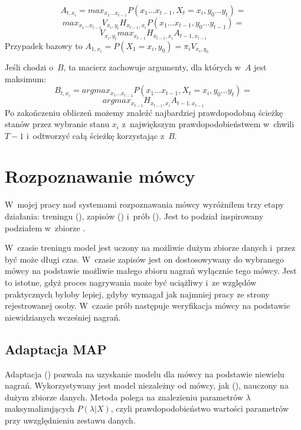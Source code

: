 $$A_{t,x_i} = max_{x_1 \dots x_{t-1}} P(x_1 \dots x_{t-1}, X_t = x_i, y_0 \dots y_t) =$$
$$max_{x_1 \dots x_{t-1}} V_{x_i, y_t} H_{x_{t-1}, x_i} P(x_1 \dots x_{t-1}, y_0 \dots y_{t-1}) =$$
$$V_{x_i, y_t} max_{x_{t-1}}H_{x_{t-1}, x_i} A_{t-1, x_{t-1}}$$
Przypadek bazowy to $A_{1,x_i} = P(X_1 = x_i, y_0) = \pi_i V_{x_i, y_0}$

Jeśli chodzi o~$B$, ta macierz zachowuje argumenty, dla których w~$A$ jest maksimum:
$$B_{t, x_i} = argmax_{x_1 \dots x_{t-1}} P(x_1 \dots x_{t-1}, X_t = x_i, y_0 \dots y_t) =$$
$$argmax_{x_{t-1}} H_{x_{t-1}, x_i} A_{t-1, x_{t-1}}$$
Po zakończeniu obliczeń możemy znaleźć najbardziej prawdopodobną ścieżkę stanów przez wybranie stanu $x_i$ z~największym prawdopodobieństwem w~chwili $T-1$ i~odtworzyć całą ścieżkę korzystając z~$B$\cite{aTutorialOnHidden}.

\section{Rozpoznawanie mówcy}\label{sec:rozpoznawanie_mowcy}

W~mojej pracy nad systemami rozpoznawania mówcy wyróżniłem trzy etapy działania: treningu (),
zapisów () i~prób (). Jest to podział inspirowany podziałem w~zbiorze .

W~czasie treningu model jest uczony na możliwie dużym zbiorze danych i~przez być może długi czas. W~czasie zapisów
jest on dostosowywany do wybranego mówcy na podstawie możliwie małego zbioru nagrań wyłącznie tego mówcy. Jest
to istotne, gdyż proces nagrywania może być uciążliwy i~ze względów praktycznych byłoby lepiej, gdyby wymagał
jak najmniej pracy ze strony rejestrowanej osoby. W~czasie prób następuje weryfikacja mówcy na podstawie niewidzianych
wcześniej nagrań.

\subsection{Adaptacja MAP}

Adaptacja  () pozwala na uzyskanie modelu dla mówcy na
podstawie niewielu nagrań. Wykorzystywany jest model niezależny
od mówcy, jak  (), nauczony na dużym zbiorze danych.
Metoda polega na znalezieniu parametrów $\lambda$
maksymalizujących $P(\lambda | X)$, czyli prawdopodobieństwo wartości parametrów przy uwzględnieniu zestawu danych.

